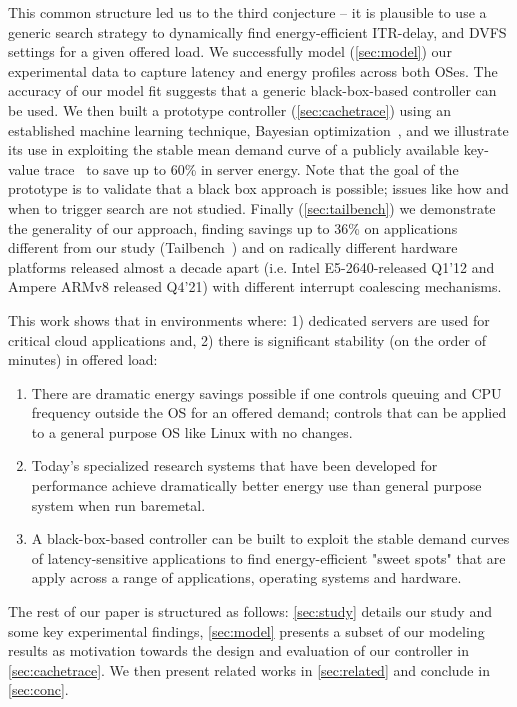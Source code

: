 This common structure led us to the third conjecture -- it is plausible to use a generic search strategy to dynamically find energy-efficient ITR-delay, and DVFS settings for a given offered load. 
We successfully model (\cref{sec:model}) our experimental data to capture latency and energy profiles across both OSes. 
The accuracy of our model fit suggests that  a generic black-box-based controller can be used.
We then  built a prototype controller (\cref{sec:cachetrace}) using 
an established machine learning technique, Bayesian optimization~\cite{garnett_bayesoptbook_2022}, and we illustrate its use in exploiting the stable mean demand curve of a publicly available key-value trace~\cite{cacheWorkload-OSDI20} to save up to 60\% in server energy. 
Note that the goal of the prototype is to validate that a black box approach is possible; issues like how and when to trigger search are not studied. 
Finally (\cref{sec:tailbench}) we demonstrate the generality of our approach,  finding savings up to 36\% on applications different from our study (Tailbench~\cite{tailbench}) and on radically different hardware platforms released almost a decade apart 
(i.e. Intel E5-2640-released Q1'12 and Ampere ARMv8 released Q4'21) with different interrupt coalescing mechanisms. 

This work shows that in environments where: 1) dedicated servers are used for critical cloud applications and, 2) there is significant stability (on the order of minutes) in offered load: 
\begin{enumerate}
   \item  There are dramatic energy savings possible if one controls queuing and CPU frequency outside the OS for an offered demand; controls that can be applied to a general purpose OS like Linux with no changes.
   
   \item  Today's specialized research systems that have been developed for performance achieve dramatically better energy use than general purpose system when run baremetal. 
   
    \item A black-box-based controller can be built to exploit the stable demand curves of latency-sensitive applications to find energy-efficient "sweet spots" that are apply across a range of applications, operating systems and hardware. 
\end{enumerate}
The rest of our paper is structured as follows: \cref{sec:study} details our study and some key experimental findings, \cref{sec:model} presents a subset of our modeling results as motivation towards the design and evaluation of our controller in \cref{sec:cachetrace}. We then present related works in \cref{sec:related} and conclude in \cref{sec:conc}.